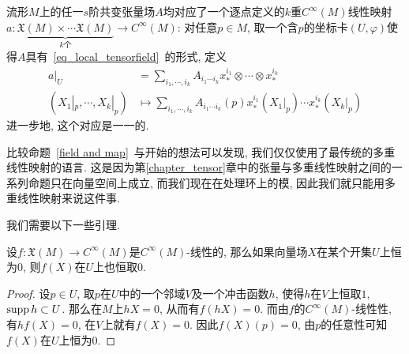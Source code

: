\begin{prop}\label{field and map}
    流形$M$上的任一$s$阶共变张量场$A$均对应了一个逐点定义的$k$重$C^\infty(M)$线性映射$a:\underbrace{\mathfrak{X}(M)\times\cdots\mathfrak{X}(M)}_{k\text{个}}\to C^\infty(M)$:
    对任意$p\in M$, 取一个含$p$的坐标卡$(U,\varphi)$使得$A$具有~\eqref{eq_local_tensorfield}~的形式, 定义
    \begin{align*}
        a|_U&=\sum_{i_1,\cdots,i_k}A_{i_1\cdots i_k}x^{i_1}_*\otimes\cdots\otimes x^{i_k}_*\\
        (X_1|_p,\cdots,X_k|_p)&\mapsto\sum_{i_1,\cdots,i_k}A_{i_1\cdots i_k}(p)x^{i_1}_*(X_1|_p)\cdots x^{i_k}_*(X_k|_p)
    \end{align*}
    进一步地, 这个对应是一一的.
\end{prop}

比较命题~\ref{field and map}~与开始的想法可以发现, 我们仅仅使用了最传统的多重线性映射的语言.
这是因为第\ref{chapter_tensor}章中的张量与多重线性映射之间的一系列命题只在向量空间上成立, 而我们现在在处理环上的模, 因此我们就只能用多重线性映射来说这件事.

我们需要以下一些引理.

\begin{lem}\label{local operator}
    设$f:\mathfrak{X}(M)\to C^\infty(M)$是$C^\infty(M)$-线性的, 那么如果向量场$X$在某个开集$U$上恒为$0$, 则$f(X)$在$U$上也恒取$0$.
\end{lem}
\begin{proof}
    设$p\in U$, 取$p$在$U$中的一个邻域$V$及一个冲击函数$h$, 使得$h$在$V$上恒取$1$, $\operatorname{supp}{h}\subset U$.
    那么在$M$上$hX=0$, 从而有$f(hX)=0$.
    而由$f$的$C^\infty(M)$-线性性, 有$hf(X)=0$, 在$V$上就有$f(X)=0$.
    因此$f(X)(p)=0$, 由$p$的任意性可知$f(X)$在$U$上恒为$0$.
\end{proof}

